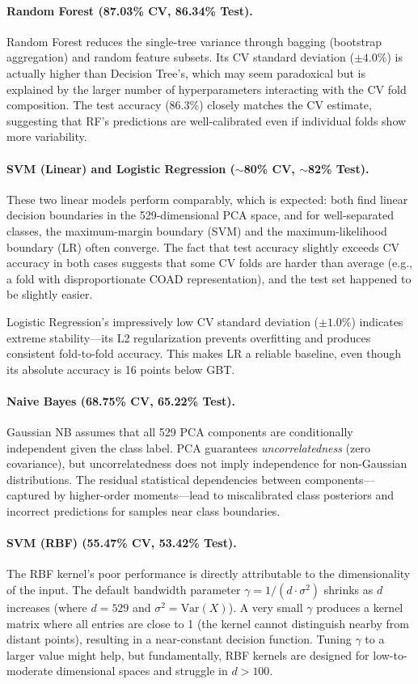 \documentclass{article}
\begin{document}
\paragraph{Random Forest (87.03\% CV, 86.34\% Test).}
Random Forest reduces the single-tree variance through bagging (bootstrap aggregation) and random feature subsets. Its CV standard deviation ($\pm 4.0\%$) is actually higher than Decision Tree's, which may seem paradoxical but is explained by the larger number of hyperparameters interacting with the CV fold composition. The test accuracy (86.3\%) closely matches the CV estimate, suggesting that RF's predictions are well-calibrated even if individual folds show more variability.

\paragraph{SVM (Linear) and Logistic Regression ($\sim$80\% CV, $\sim$82\% Test).}
These two linear models perform comparably, which is expected: both find linear decision boundaries in the 529-dimensional PCA space, and for well-separated classes, the maximum-margin boundary (SVM) and the maximum-likelihood boundary (LR) often converge. The fact that test accuracy slightly exceeds CV accuracy in both cases suggests that some CV folds are harder than average (e.g., a fold with disproportionate COAD representation), and the test set happened to be slightly easier.

Logistic Regression's impressively low CV standard deviation ($\pm 1.0\%$) indicates extreme stability---its L2 regularization prevents overfitting and produces consistent fold-to-fold accuracy. This makes LR a reliable baseline, even though its absolute accuracy is 16 points below GBT.

\paragraph{Naive Bayes (68.75\% CV, 65.22\% Test).}
Gaussian NB assumes that all 529 PCA components are conditionally independent given the class label. PCA guarantees \textit{uncorrelatedness} (zero covariance), but uncorrelatedness does not imply independence for non-Gaussian distributions. The residual statistical dependencies between components---captured by higher-order moments---lead to miscalibrated class posteriors and incorrect predictions for samples near class boundaries.

\paragraph{SVM (RBF) (55.47\% CV, 53.42\% Test).}
The RBF kernel's poor performance is directly attributable to the dimensionality of the input. The default bandwidth parameter $\gamma = 1/(d \cdot \sigma^2)$ shrinks as $d$ increases (where $d = 529$ and $\sigma^2 = \text{Var}(X)$). A very small $\gamma$ produces a kernel matrix where all entries are close to 1 (the kernel cannot distinguish nearby from distant points), resulting in a near-constant decision function. Tuning $\gamma$ to a larger value might help, but fundamentally, RBF kernels are designed for low-to-moderate dimensional spaces and struggle in $d > 100$.
\end{document}
